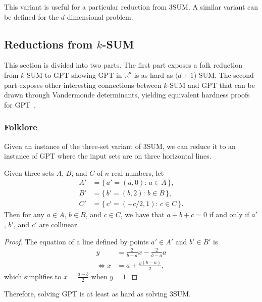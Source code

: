 This variant is useful for a particular reduction from 3SUM.
A similar variant can be defined for the \(d\)-dimensional problem.

\subsection{Reductions from \texorpdfstring{\(k\)-SUM}{k-SUM}}%
\label{sec:history:pol:reductions-from-ksum}

This section is divided into two parts.
%
The first part exposes a folk reduction from \(k\)-SUM to GPT showing
GPT in \(\mathbb{R}^d\) is as hard as \((d+1\))-SUM.
%
The second part exposes other interesting connections between \(k\)-SUM and GPT
that can be drawn through Vandermonde determinants, yielding equivalent
hardness proofs for GPT~\cite{Er99b}.


\subsubsection{Folklore}

Given an instance of the three-set variant of 3SUM,
we can reduce it to an instance of GPT where the input sets are on three
horizontal lines.
%
\begin{observation}[label=obs:3sum-to-gpt]
Given three sets \(A\), \(B\), and \(C\) of \(n\) real numbers, let
\begin{align*}
    A' &= \{\, a' = (a,0) \colon\, a \in A\,\},\\
    B' &= \{\, b' = (b,2) \colon\, b \in B\,\},\\
    C' &= \{\, c' = (-c/2,1) \colon\, c \in C\,\}.
\end{align*}
Then for any \(a \in A\), \(b \in B\), and \(c \in C\), we have that
\(a+b+c=0\) if and only if \(a'\), \(b'\), and \(c'\) are collinear.
\end{observation}
%
\begin{proof}
    The equation of a line defined by points \(a' \in A'\) and \(b' \in B'\)
    is
    \begin{align*}
	y &= \frac{2}{b-a} x - \frac{2}{b-a} a\\
	\iff x &= a + \frac{y (b-a)}{2},
    \end{align*}
    which simplifies to \(x = \frac{a+b}{2}\) when \(y = 1\).
\end{proof}

Therefore, solving GPT is at least as hard as solving 3SUM.

